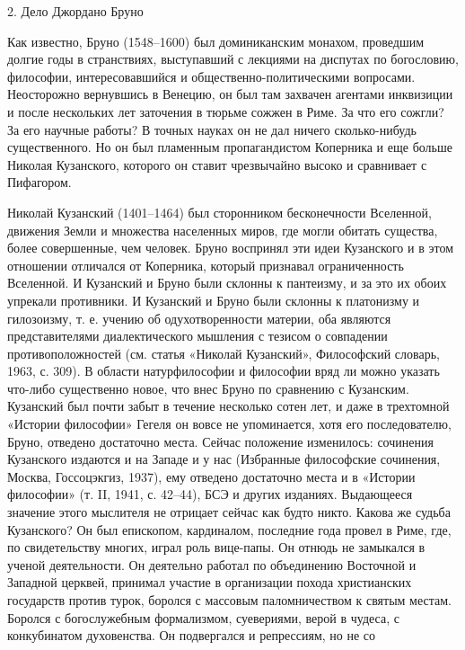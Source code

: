 2. Дело Джордано Бруно

Как известно, Бруно (1548--1600)  был доминиканским монахом, проведшим
долгие  годы в  странствиях,  выступавший с  лекциями  на диспутах  по
богословию,  философии,  интересовавшийся и  общественно-политическими
вопросами.  Неосторожно  вернувшись в  Венецию,  он  был там  захвачен
агентами инквизиции и после нескольких лет заточения в тюрьме сожжен в
Риме. За  что его сожгли?  За его научные  работы? В точных  науках он
не  дал  ничего  сколько-нибудь  существенного. Но  он  был  пламенным
пропагандистом Коперника и еще  больше Николая Кузанского, которого он
ставит чрезвычайно высоко и сравнивает с Пифагором.

Николай   Кузанский   (1401--1464)   был   сторонником   бесконечности
Вселенной,  движения Земли  и  множества населенных  миров, где  могли
обитать существа, более совершенные,  чем человек. Бруно воспринял эти
идеи Кузанского  и в  этом отношении  отличался от  Коперника, который
признавал ограниченность Вселенной. И Кузанский и Бруно были склонны к
пантеизму,  и за  это  их  обоих упрекали  противники.  И Кузанский  и
Бруно  были  склонны  к  платонизму  и гилозоизму,  т.  е.  учению  об
одухотворенности материи, оба являются представителями диалектического
мышления  с  тезисом  о   совпадении  противоположностей  (см.  статья
«Николай  Кузанский», Философский  словарь, 1963,  с. 309).  В области
натурфилософии и философии вряд  ли можно указать что-либо существенно
новое, что  внес Бруно по  сравнению с Кузанским. Кузанский  был почти
забыт  в течение  несколько сотен  лет, и  даже в  трехтомной «Истории
философии»  Гегеля он  вовсе не  упоминается, хотя  его последователю,
Бруно,  отведено   достаточно  места.  Сейчас   положение  изменилось:
сочинения  Кузанского  издаются  и  на   Западе  и  у  нас  (Избранные
философские  сочинения,  Москва,   Госсоцэкгиз,  1937),  ему  отведено
достаточно места и в «Истории философии» (т. II, 1941, с. 42--44), БСЭ
и  других изданиях.  Выдающееся значение  этого мыслителя  не отрицает
сейчас как будто никто. Какова же судьба Кузанского? Он был епископом,
кардиналом,  последние  года  провел  в Риме,  где,  по  свидетельству
многих,  играл  роль  вице-папы.  Он  отнюдь  не  замыкался  в  ученой
деятельности. Он деятельно работал по объединению Восточной и Западной
церквей, принимал участие в организации похода христианских государств
против  турок,  боролся с  массовым  паломничеством  к святым  местам.
Боролся  с богослужебным  формализмом, суевериями,  верой в  чудеса, с
конкубинатом  духовенства.  Он  подвергался  и репрессиям,  но  не  со

